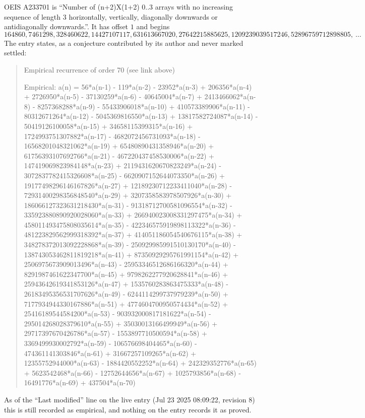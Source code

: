 \documentclass[11pt,a4paper]{article}
\theoremstyle{plain}
\theoremstyle{definition}
\begin{document}
OEIS A233701 is ``Number of (n+2)X(1+2) 0..3 arrays with no increasing sequence of length 3 horizontally, vertically, diagonally downwards or antidiagonally downwards.''. It has offset $1$ and begins
\[
164860, 7461298, 328460622, 14427107117, 631613667020, 27642215885625, 1209239039517246, 52896759712898805,\ \dots
\]
The entry states, as a conjecture contributed by its author and never marked settled:
\begin{quote}
Empirical recurrence of order 70 (see link above)

Empirical: a(n) = 56*a(n-1) - 119*a(n-2) - 23952*a(n-3) + 206356*a(n-4) + 2726950*a(n-5) - 37130259*a(n-6) - 40645004*a(n-7) + 2413466062*a(n-8) - 8257368288*a(n-9) - 55433906018*a(n-10) + 410573389906*a(n-11) - 80312671264*a(n-12) - 5045369816550*a(n-13) + 13817582724087*a(n-14) - 50419126100058*a(n-15) + 34658115399315*a(n-16) + 1724993751307882*a(n-17) - 4682072456731093*a(n-18) - 16568201048321062*a(n-19) + 65480890431358946*a(n-20) + 61756393107692766*a(n-21) - 467220437458530006*a(n-22) + 147419069823984148*a(n-23) + 2119431620670823249*a(n-24) - 3072837782415326608*a(n-25) - 6620907152644073350*a(n-26) + 19177498296146167826*a(n-27) + 12189230712233411040*a(n-28) - 72931400298356848540*a(n-29) + 3207358583978507926*a(n-30) + 186066127323631218430*a(n-31) - 91318712700581096554*a(n-32) - 335923880890920028060*a(n-33) + 266940023008331297475*a(n-34) + 458011493475808035614*a(n-35) - 422346575919898113322*a(n-36) - 481223829562999318392*a(n-37) + 414051186054540676115*a(n-38) + 348278372013092228868*a(n-39) - 250929985991510130170*a(n-40) - 138743053462811819218*a(n-41) + 87350929295761991154*a(n-42) + 2506975673909013496*a(n-43) - 25953346512686166320*a(n-44) + 8291987461622347700*a(n-45) + 9798262277920628841*a(n-46) + 25943642619341853126*a(n-47) + 1535760283863475333*a(n-48) - 26183495356531707626*a(n-49) - 6244114299737979239*a(n-50) + 7177934944330167886*a(n-51) + 4774604700950574434*a(n-52) + 25416189544584200*a(n-53) - 903932000817181622*a(n-54) - 295014268028379610*a(n-55) + 35030013166499949*a(n-56) + 29717397670426786*a(n-57) - 1553897710500594*a(n-58) + 3369499930002792*a(n-59) - 106576698404465*a(n-60) - 474361141303846*a(n-61) + 31667257109265*a(n-62) + 12355752944000*a(n-63) - 1884420552252*a(n-64) + 242329352776*a(n-65) + 5623542468*a(n-66) - 12752644656*a(n-67) + 1025793856*a(n-68) - 16491776*a(n-69) + 437504*a(n-70)
\end{quote}
As of the ``Last modified'' line on the live entry (Jul 23 2025 08:09:22, revision 8) this is still
recorded as empirical, and nothing on the entry records it as proved.
\end{document}
